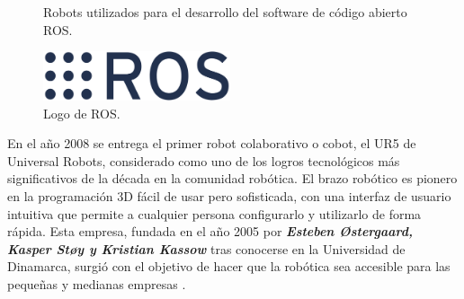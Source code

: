 \begin{itemize}
  \begin{figure}[h!]
    \begin{center}
      \subcapcentertrue
      \hspace{2mm}
    \end{center}
    \caption{Robots utilizados para el desarrollo del software de código abierto ROS.}
    \label{fig:PR_ROS}
  \end{figure}
  
  \pagebreak
  
  \begin{figure} [h!]
    \begin{center}
      \includegraphics[width=55mm]{figs/ROS_logo.png}
    \end{center}
    \caption{Logo de ROS.}
    \label{fig:ROS}
  \end{figure}
  
  
  En el año 2008 se entrega el primer robot colaborativo o cobot, el UR5 de Universal Robots, considerado como uno de los logros tecnológicos más significativos de la década en la comunidad robótica. El brazo robótico es pionero en la programación 3D fácil de usar pero sofisticada, con una interfaz de usuario intuitiva que permite a cualquier persona configurarlo y utilizarlo de forma rápida. Esta empresa, fundada en el año 2005 por \textbf{\emph{Esteben Østergaard, Kasper Støy y Kristian Kassow}} tras conocerse en la Universidad de Dinamarca, surgió con el objetivo de hacer que la robótica sea accesible para las pequeñas y medianas empresas \cite{UR}. \\
  

\end{itemize}
